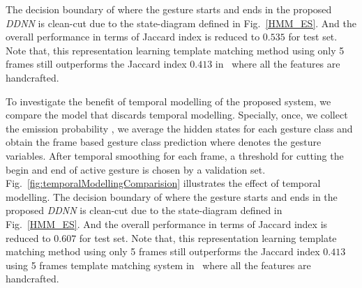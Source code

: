 
%
The decision boundary of where the gesture starts and ends in the proposed \emph{DDNN} is clean-cut due to the state-diagram defined in Fig.~\ref{HMM_ES}.
%
And the overall performance in terms of  Jaccard index is reduced to $0.535$ for test set.
Note that, this representation learning template matching method using only 5 frames still outperforms
the Jaccard index $0.413$ in~\cite{camgoz2014gesture} where all the features are handcrafted.


To investigate the benefit of temporal modelling of the proposed system, we compare the model that discards temporal modelling. Specially, once, we collect the emission probability \emissionprob{}, we average the hidden states for each gesture class and obtain the frame based gesture class prediction \gestureEmissionProb where \gesturehiddenstateFrame denotes the gesture variables. After temporal smoothing for each frame, a threshold for cutting the begin and end of active gesture is chosen by a validation set. Fig.~\ref{fig:temporalModellingComparision} illustrates the effect of temporal modelling. The decision boundary of where the gesture starts and ends in the proposed \emph{DDNN} is clean-cut due to the state-diagram defined in Fig.~\ref{HMM_ES}. And the overall performance in terms of  Jaccard index is reduced to $0.607$ for test set. Note that, this representation learning template matching method using only 5 frames still outperforms the Jaccard index $0.413$ using 5 frames template matching system in~\cite{camgoz2014gesture} where all the features are handcrafted.

